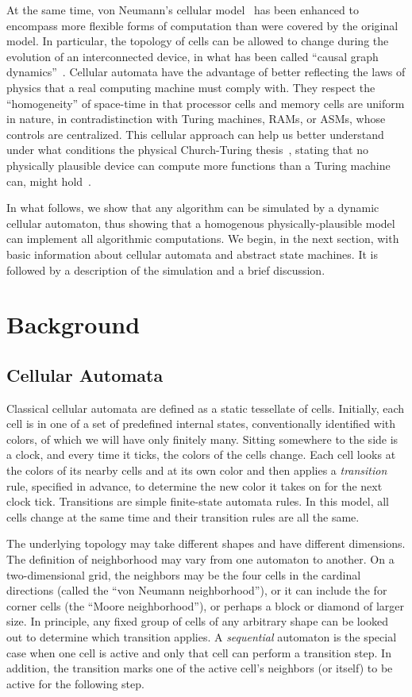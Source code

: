 \documentclass[submission,copyright,creativecommons,english]{eptcs}
\begin{document}
At the same time, von Neumann's cellular model~\cite{cell} has been enhanced to encompass more flexible forms of computation than were  covered by the original model.
In particular, the topology of cells can be allowed to change during the evolution of an interconnected device, in what has been called ``causal graph dynamics''~\cite{causal}.
Cellular automata have the advantage of 
better reflecting the laws of physics that a real computing
machine must comply with.
They respect the ``homogeneity'' of space-time in that processor cells and memory cells are uniform in nature,
in contradistinction with Turing machines, RAMs, or ASMs, whose controls are centralized.
This cellular approach can help us better understand under what conditions the physical Church-Turing thesis~\cite{Gandy}, stating that 
no physically plausible device can compute more functions than a Turing machine can, might hold~\cite{PCTT}.

In what follows, we show that any algorithm
can be simulated by a dynamic cellular automaton,
thus showing that a homogenous physically-plausible model 
can implement all algorithmic computations.
We begin, in the next section, with basic information about cellular automata and abstract state machines.
It is followed by a description of the simulation and a brief discussion.

\section{Background}
\subsection{Cellular Automata}

Classical cellular automata
are defined as a static tessellate of cells. 
Initially, each cell is in one of a set of predefined internal states, conventionally identified with colors, {of which we will have only finitely many.}
Sitting somewhere to the side is a clock, and every time it ticks, the colors of the cells change.
Each cell looks at the colors of its nearby cells and at its own color and then applies a  \emph{transition} rule, 
specified in advance, to determine the new color it takes on for  the next clock tick.
Transitions are simple finite-state automata rules.
In this model,
all cells change at the same time and their
transition rules are all the same.

The underlying topology may take different shapes and have different dimensions.
The definition of neighborhood may vary from one automaton to another.
On a two-dimensional grid, the neighbors may be the four cells in the cardinal directions (called the ``von Neumann neighborhood''), or it can include the for corner cells (the ``Moore neighborhood''), or perhaps  a block or diamond of larger size.
In principle, any fixed group of cells of any arbitrary shape can be looked out to determine which transition applies.
A \emph{sequential} automaton is the special case when one cell is  active and only that cell can
perform a transition step. In addition, the transition  marks one of the active cell's neighbors (or itself) to be active for the following step.
\end{document}
